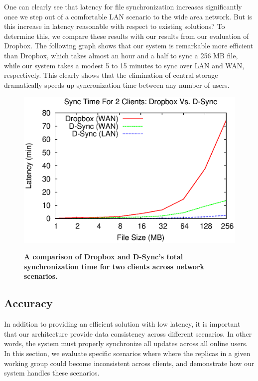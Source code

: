 One can clearly see that latency for file synchronization
increases significantly once we step out of a comfortable LAN
scenario to the wide area network.
But is this increase in latency reasonable with respect to existing solutions?
To determine this, we compare these results with our results
from our evaluation of Dropbox. The following graph shows that our system is
remarkable more efficient than Dropbox, which takes almost an hour and a half to
sync a 256 MB file, while our system takes a modest 5 to 15 minutes to sync over
LAN and WAN, respectively. This clearly shows that the elimination of
central storage dramatically speeds up syncronization time between
any number of users.

\begin{figure}[h]
    \centering
    \includegraphics[scale=0.5]{figs/Dropbox_Performance.eps}
    \label{fig:dropbox}
    \caption{\textbf{A comparison of Dropbox and D-Sync's total synchronization time for two clients across network scenarios.}}
\end{figure}

\subsection{Accuracy}
\label{evaluation.accuracy}
In addition to providing an efficient solution with low latency,
it is important that our architecture provide data consistency across different
scenarios.
In other words, the system must properly synchronize
all updates across all online users.
In this section, we evaluate specific scenarios where
where the replicas in a given working group could become inconsistent across clients,
and demonstrate how our system handles these scenarios.

